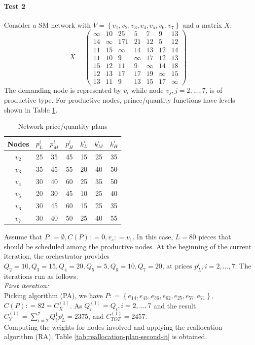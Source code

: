 \paragraph{Test 2}
Consider a SM network with $V = \left\{v_1, v_2, v_3, v_4, v_5, v_6, v_7 \right\}$ and a matrix $X$: $$X = \begin{pmatrix}\infty & 10 & 25 & 5 & 7 & 9 & 13\\ 14 & \infty & 171 & 21 & 12 & 5 & 12 \\ 11 & 15 & \infty & 14 & 13 & 12 & 14\\ 11 & 10 & 9 & \infty & 17 & 12 & 13 \\ 15 & 12 & 11 & 9 & \infty & 14 & 18\\ 12 & 13 & 17 & 17 & 19 & \infty & 15\\ 13 & 11 & 9 & 13 & 15 & 17 & \infty \end{pmatrix}$$
The demanding node is represented by $v_i$ while node $v_j , j=2, ..., 7$, is of productive type. For productive nodes, prince/quantity functions have levels shown in Table \ref{tab:network-price-quantity-plans}.

\begin{table}[h]
    \centering
    \begin{tabular}{|c|c|c|c|c|c|c|}
        \hline
        \textbf{Nodes} & \textbf{$p_L^i$} & \textbf{$p_M^i$} & \textbf{$p_H^i$} & \textbf{$k_L^i$} & \textbf{$k_M^i$} & \textbf{$k_H^i$} \\
        \hline
        $v_2$ & 25 & 35 & 45 & 15 & 25 & 35\\
        \hline
        $v_3$ & 35 & 45 & 55 & 20 & 40 & 50\\
        \hline
        $v_4$ & 30 & 40 & 60 & 25 & 35 & 50\\
        \hline
        $v_5$ & 20 & 30 & 45 & 10 & 25 & 40\\
        \hline
        $v_6$ & 30 & 45 & 60 & 15 & 25 & 35\\
        \hline
        $v_7$ & 30 & 40 & 50 & 25 & 40 & 55\\
        \hline
    \end{tabular}

    \caption{Network price/quantity plans}
    \label{tab:network-price-quantity-plans}
\end{table}

Assume that $P : = \emptyset, C(P) : = 0, v_s : = v_1$. In this case, $L = 80$ pieces that should be scheduled among the productive nodes. At the beginning of the current iteration, the orchestrator provides $Q_2 = 10, Q_3 = 15, Q_4 = 20, Q_5 = 5, Q_6 = 10, Q_7 = 20$, at prices $p_L^i , i=2,...,7$. The iterations run as follows.\\
\textit{First iteration:}\\
Picking algorithm (PA), we have $P : = \left\{e_{14},e_{43}, e_{36}, e_{62}, e_{25}, e_{57}, e_{71}\right\}$, $C(P) : = 82 = C_X^{(1)}$. As $Q_i^{(1)} = Q_i, i=2,...,7$ and the result $C_Y^{(1)} = \sum^{7}_{i=2} Q_i^{1} p_L^i = 2375$, and $C_{TOT}^{(1)} = 2457$.\\
Computing the weights for nodes involved and applying the reallocation algorithm (RA), Table \ref{tab:reallocation-plan-second-it} is obtained.

